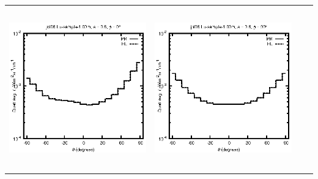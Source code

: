 \begin{tabular}{c c c c}
\includegraphics[height=7cm]{../eps/jol06_Lu_sample_1.00m_fwd.eps} &
\includegraphics[height=7cm]{../eps/jol06_Lu_sample_1.00m_cross.eps} \\
\end{tabular}

\pagebreak

